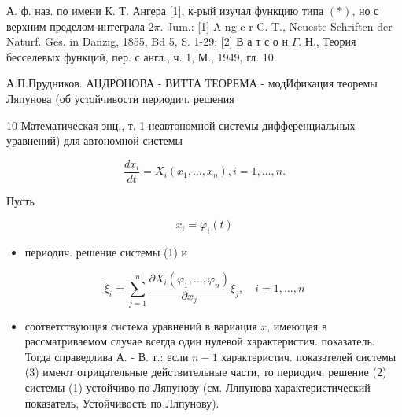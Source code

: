 \documentclass[10pt]{article}
\begin{document}
А. ф. наз. по имени К. Т. Ангера [1], к-рый изучал функцию типа $(*)$, но с верхним пределом интеграла $2 \pi$. Jum.: [1] A ng e r C. T., Neueste Schriften der Naturf. Ges. in Danzig, 1855, Bd 5, S. 1-29; [2] В а т с о н $\Gamma$. Н., Теория бесселевых функций, пер. с англ., ч. 1, М., 1949, гл. 10.



А.П.Прудников. АНДРОНОВА - ВИТТА ТЕОРЕМА - модИфикация теоремы Ляпунова (об устойчивости периодич. решения



10 Математическая энц., т. 1 неавтономной системы дифференциальных уравнений) для автономной системы



\[

\frac{d x_{i}}{d t}=X_{i}\left(x_{1}, \ldots, x_{n}\right), i=1, \ldots, n .

\]



Пусть



\[

x_{i}=\varphi_{i}(t)

\]



\begin{itemize}

  \item периодич. решение системы (1) и

\end{itemize}



\[

\dot{\xi}_{i}=\sum_{j=1}^{n} \frac{\partial X_{i}\left(\varphi_{1}, \ldots, \varphi_{n}\right)}{\partial x_{j}} \xi_{j}, \quad i=1, \ldots, n

\]



\begin{itemize}

  \item соответствующая система уравнений в вариация $x$, имеющая в рассматриваемом случае всегда один нулевой характеристич. показатель. Тогда справедлива А. - В. т.: если $n-1$ характеристич. показателей системы (3) имеют отрицательные действительные части, то периодич. решение (2) системы (1) устойчиво по Ляпунову (см. Ллпунова характеристический показатель, Устойчивость по Ллпунову).

\end{itemize}
\end{document}
